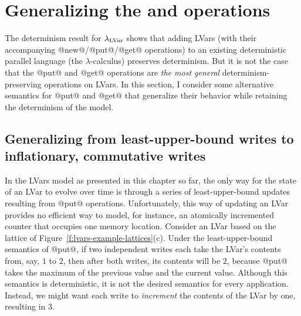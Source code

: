\section{Generalizing the  and  operations}\label{s:lvars-generalizing}

The determinism result for $\lambda_{\textrm{LVar}}$ shows that adding LVars (with
their accompanying @new@/@put@/@get@ operations) to an existing
deterministic parallel language (the $\lambda$-calculus) preserves
determinism.  But it is not the case that the @put@ and @get@
operations are \emph{the most general} determinism-preserving
operations on LVars.  In this section, I consider some alternative
semantics for @put@ and @get@ that generalize their behavior while
retaining the determinism of the model.

\subsection{Generalizing from least-upper-bound writes to inflationary, commutative writes}\label{subsection:lvars-generalizing-from-least-upper-bound-writes}

In the LVars model as presented in this chapter so far, the only way
for the state of an LVar to evolve over time is through a series of
least-upper-bound updates resulting from @put@ operations.
Unfortunately, this way of updating an LVar provides no efficient way
to model, for instance, an atomically incremented counter that
occupies one memory location.  Consider an LVar based on the lattice
of Figure~\ref{f:lvars-example-lattices}(c).  Under the
least-upper-bound semantics of @put@, if two independent writes each
take the LVar's contents from, say, $1$ to $2$, then after both
writes, its contents will be $2$, because @put@ takes the maximum of
the previous value and the current value.  Although this semantics is
deterministic, it is not the desired semantics for every application.
Instead, we might want each write to \emph{increment} the contents of
the LVar by one, resulting in $3$.


